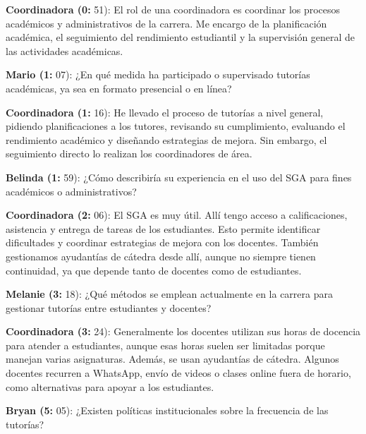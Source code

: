 \noindent\textbf{Coordinadora (0:} 51): El rol de una coordinadora es coordinar los procesos académicos y administrativos de la carrera. Me encargo de la planificación académica, el seguimiento del rendimiento estudiantil y la supervisión general de las actividades académicas.\par\smallskip

\noindent\textbf{Mario (1:} 07): ¿En qué medida ha participado o supervisado tutorías académicas, ya sea en formato presencial o en línea?\par\smallskip

\noindent\textbf{Coordinadora (1:} 16): He llevado el proceso de tutorías a nivel general, pidiendo planificaciones a los tutores, revisando su cumplimiento, evaluando el rendimiento académico y diseñando estrategias de mejora. Sin embargo, el seguimiento directo lo realizan los coordinadores de área.\par\smallskip

\noindent\textbf{Belinda (1:} 59): ¿Cómo describiría su experiencia en el uso del SGA para fines académicos o administrativos?\par\smallskip

\noindent\textbf{Coordinadora (2:} 06): El SGA es muy útil. Allí tengo acceso a calificaciones, asistencia y entrega de tareas de los estudiantes. Esto permite identificar dificultades y coordinar estrategias de mejora con los docentes. También gestionamos ayudantías de cátedra desde allí, aunque no siempre tienen continuidad, ya que depende tanto de docentes como de estudiantes.\par\smallskip

\noindent\textbf{Melanie (3:} 18): ¿Qué métodos se emplean actualmente en la carrera para gestionar tutorías entre estudiantes y docentes?\par\smallskip

\noindent\textbf{Coordinadora (3:} 24): Generalmente los docentes utilizan sus horas de docencia para atender a estudiantes, aunque esas horas suelen ser limitadas porque manejan varias asignaturas. Además, se usan ayudantías de cátedra. Algunos docentes recurren a WhatsApp, envío de videos o clases online fuera de horario, como alternativas para apoyar a los estudiantes.\par\smallskip

\noindent\textbf{Bryan (5:} 05): ¿Existen políticas institucionales sobre la frecuencia de las tutorías?\par\smallskip

